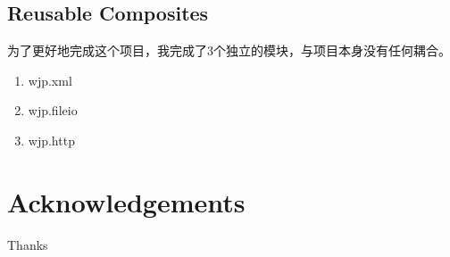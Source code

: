 ﻿\documentclass{beamer}
\begin{document}
\subsection{Reusable Composites}
\begin{frame}
  为了更好地完成这个项目，我完成了3个独立的模块，与项目本身没有任何耦合。
  \begin{enumerate}
  \item wjp.xml
  \item wjp.fileio
  \item wjp.http
  \end{enumerate}
\end{frame}  


\section{Acknowledgements}

\begin{frame}
\begin{center}
\Huge{Thanks}
\end{center}
\end{frame}
\end{document}
